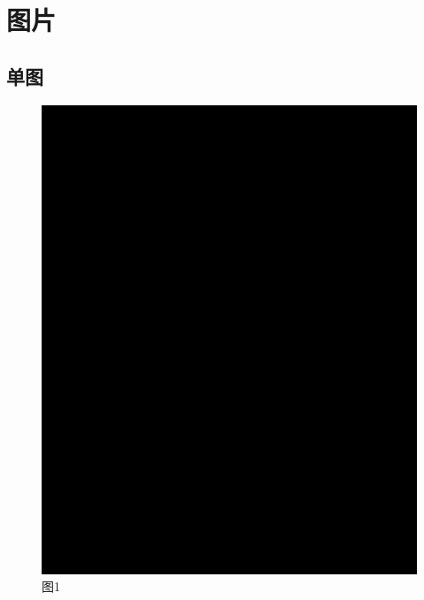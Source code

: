 \documentclass[12pt, a4paper, oneside]{ctexart}
\begin{document}
\begin{table}[htbp]
    \centering  %
    \caption{ }  %
    \label{tab333}  %
    \begin{tabular}{|c|c|}
    \end{tabular}
\end{table}

\begin{table}[htbp]
    \centering  %
    \caption{ }  %
    \label{tab222}  %
    \begin{tabular}{|c|c|}
    \end{tabular}
\end{table}


\section{图片}
\subsection{单图}
\begin{figure} [htbp!]
    \centering
    \includegraphics[scale=0.5]{fig.png}
    \caption{图1}
    \label{fig1}
\end{figure}
\end{document}
